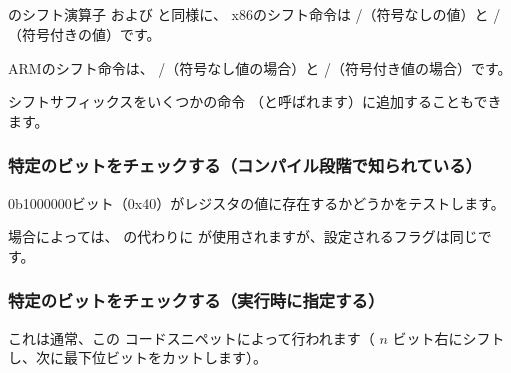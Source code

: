 ﻿%
\subsection{\Conclusion{}}


\CCpp のシフト演算子 \TT{$\ll$} および \TT{$\gg$} と同様に、
x86のシフト命令は \SHR/\SHL （符号なしの値）と \SAR/\SHL （符号付きの値）です。


ARMのシフト命令は、 \LSR/\LSL （符号なし値の場合）と \ASR/\LSL （符号付き値の場合）です。

シフトサフィックスをいくつかの命令
（と呼ばれます）に追加することもできます。

\subsubsection{特定のビットをチェックする（コンパイル段階で知られている）}

0b1000000ビット（0x40）がレジスタの値に存在するかどうかをテストします。










場合によっては、 \TEST の代わりに \AND が使用されますが、設定されるフラグは同じです。

\subsubsection{特定のビットをチェックする（実行時に指定する）}

これは通常、この \CCpp コードスニペットによって行われます（ $n$ ビット右にシフトし、次に最下位ビットをカットします）。



